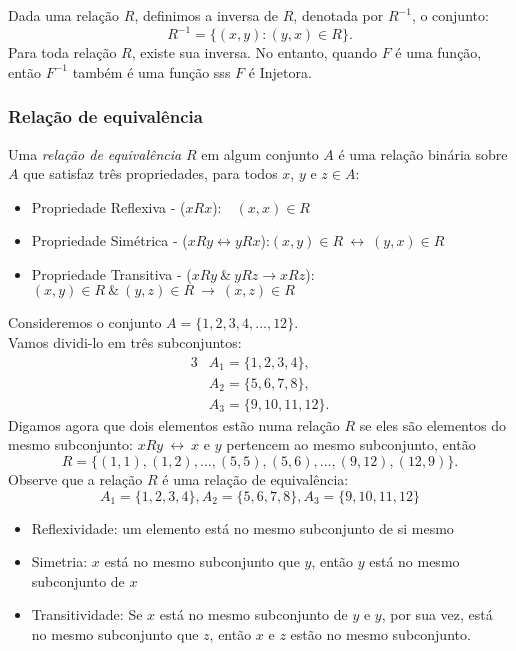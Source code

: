          \begin{definition}[Inversa]
            Dada uma relação $R$, definimos a inversa de $R$, denotada por $R^{-1}$, o conjunto:
            $$R^{-1} = \{( x, y ): ( y, x ) \in R\}.$$
            Para toda relação $R$, existe sua inversa. No entanto, quando $F$ é uma função, então $F^{-1}$ também é uma função sss $F$ é Injetora.
         \end{definition}

      \subsubsection{Relação de equivalência}
         \begin{definition}
            Uma \emph{relação de equivalência} $R$ em algum conjunto $A$ é uma relação binária sobre $A$ que satisfaz três propriedades, para todos $x$, $y$ e $z \in A$:
            \begin{itemize}
               \item Propriedade Reflexiva - ($xRx$):\quad \quad \quad \quad \quad \quad \quad\ \ $( x, x ) \in R$
               \item Propriedade Simétrica - ($xRy \leftrightarrow yRx$):\quad \quad \quad \quad $( x, y ) \in R\ \leftrightarrow\ ( y, x ) \in R$
               \item Propriedade Transitiva - ($xRy\ \&\ yRz \rightarrow xRz$):\quad $( x, y ) \in R\ \&\ ( y, z ) \in R\ \rightarrow\ ( x, z ) \in R$
            \end{itemize}
         \end{definition}
         \begin{exmp}
            Consideremos o conjunto $A = \{1,2,3,4, \dots , 12\}.$\\
            Vamos dividi-lo em três subconjuntos:
            \begin{alignat*}{3}
               &A_{1} = \{1,2,3,4\},\\
               &A_{2} = \{5,6,7,8\},\\
               &A_{3} = \{9,10,11,12\}.
            \end{alignat*}
            Digamos agora que dois elementos estão numa relação $R$ se eles são elementos do mesmo subconjunto:
            $xRy\ \leftrightarrow\ x$ e $y$ pertencem ao mesmo subconjunto, então
            $$R = \{( 1,1 ) , ( 1,2 ) , \dots , ( 5,5 ) , ( 5,6 ) , \dots , ( 9,12 ) , ( 12,9 ) \}.$$
            Observe que a relação $R$ é uma relação de equivalência:
            $$A_{1} = \{1,2,3,4\}, A_{2} = \{5,6,7,8\}, A_{3} = \{9,10,11,12\}$$
            \begin{itemize}
               \item Reflexividade: um elemento está no mesmo subconjunto de si mesmo
               \item Simetria: $x$ está no mesmo subconjunto que $y$, então $y$ está no mesmo subconjunto de $x$
               \item Transitividade: Se $x$ está no mesmo subconjunto de $y$ e $y$, por sua vez, está no mesmo subconjunto que $z$, então $x$ e $z$ estão no mesmo subconjunto.
            \end{itemize}
         \end{exmp}

